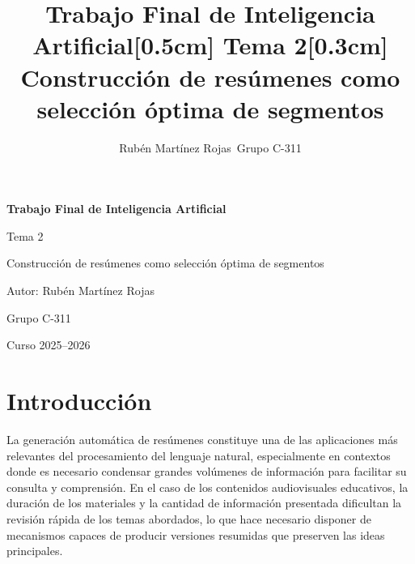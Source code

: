 \documentclass[12pt,a4paper]{article}
\title{
\textbf{Trabajo Final de Inteligencia Artificial}[0.5cm]
Tema 2[0.3cm]
Construcción de resúmenes como selección óptima de segmentos
}
\author{
Rubén Martínez Rojas\
Grupo C-311
}
\date{}
\begin{document}

\begin{titlepage}

\centering

\vspace*{3cm}

{\Huge \textbf{Trabajo Final de Inteligencia Artificial}\par}

\vspace{1cm}

{\Large Tema 2\par}

\vspace{0.4cm}

{\Large Construcción de resúmenes como selección óptima de segmentos\par}

\vfill

{\Large Autor: Rubén Martínez Rojas\par}

\vspace{0.3cm}

{\Large Grupo C-311\par}

\vfill

{\large Curso 2025--2026\par}


\end{titlepage}


\tableofcontents

\newpage


\section{Introducción}

La generación automática de resúmenes constituye una de las aplicaciones más relevantes del procesamiento del lenguaje natural, especialmente en contextos donde es necesario condensar grandes volúmenes de información para facilitar su consulta y comprensión. En el caso de los contenidos audiovisuales educativos, la duración de los materiales y la cantidad de información presentada dificultan la revisión rápida de los temas abordados, lo que hace necesario disponer de mecanismos capaces de producir versiones resumidas que preserven las ideas principales.
\end{document}
